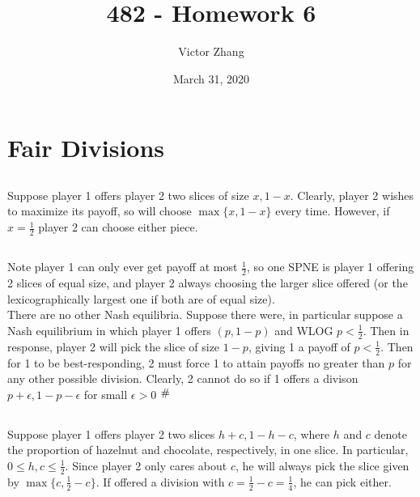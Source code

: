 \documentclass{article}
\title{482 - Homework 6}
\author{Victor Zhang}
\date{March 31, 2020}
\newcommand{\contra}{\raisebox{\depth}{\#}}
\begin{document}
\maketitle

\section{Fair Divisions}
\subsection{}
Suppose player 1 offers player 2 two slices of size $x,1-x$. Clearly, player 2 wishes to maximize its payoff, so will choose $\max \{x,1-x\}$ every time. However, if $x = \frac{1}{2}$ player 2 can choose either piece.
\subsection{}
Note player 1 can only ever get payoff at most $\frac{1}{2}$, so one SPNE is player 1 offering 2 slices of equal size, and player 2 always choosing the larger slice offered (or the lexicographically largest one if both are of equal size).\\
There are no other Nash equilibria. Suppose there were, in particular suppose a Nash equilibrium in which player 1 offers $(p,1-p)$ and WLOG $p < \frac{1}{2}$. Then in response, player 2 will pick the slice of size $1-p$, giving 1 a payoff of $p < \frac{1}{2}$. Then for 1 to be best-responding, 2 must force 1 to attain payoffs no greater than $p$ for any other possible division. Clearly, 2 cannot do so if 1 offers a divison $p + \epsilon, 1- p -\epsilon$ for small $\epsilon > 0$ $\contra$
\subsection{}
Suppose player 1 offers player 2 two slices $h+c, 1-h-c$, where $h$ and $c$ denote the proportion of hazelnut and chocolate, respectively, in one slice. In particular, $0\leq h,c \leq \frac{1}{2}$. Since player 2 only cares about $c$, he will always pick the slice given by $\max\{c,\frac{1}{2}-c\}$. If offered a division with $c = \frac{1}{2} - c = \frac{1}{4}$, he can pick either.
\end{document}

